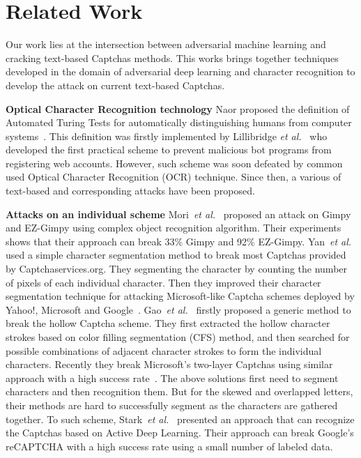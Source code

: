 \section{Related Work}
Our work lies at the intersection between adversarial machine learning and cracking text-based Captchas methods. This works brings together techniques developed in the domain of adversarial deep learning and character recognition to develop the attack on current text-based Captchas.

\noindent \textbf{Optical Character Recognition technology} Naor proposed the definition of Automated Turing Tests for automatically distinguishing humans from computer systems~\cite{Naor1996Verification}. This definition was firstly implemented by Lillibridge \emph{et al.}~\cite{Lillibridge2001Method} who developed the first practical scheme to prevent malicious bot programs from registering web accounts. However, such scheme was soon defeated by common used Optical Character Recognition (OCR) technique. Since then, a various of text-based and corresponding attacks have been proposed.

\noindent \textbf{Attacks on an individual scheme} Mori~\emph{et al.}~\cite{Mori2003Recognizing} proposed an attack on Gimpy and EZ-Gimpy using complex object recognition algorithm. Their experiments shows that their approach can break 33\% Gimpy and 92\% EZ-Gimpy. Yan~\emph{et al.}~\cite{Yan2007Breaking} used a simple character segmentation method to break most Captchas provided by Captchaservices.org. They segmenting the character by counting the number of pixels of each individual character. Then they improved their character segmentation technique for attacking Microsoft-like Captcha schemes deployed by Yahoo!, Microsoft and Google~\cite{Yan2008A}. Gao~\emph{et al.}~\cite{Gao2013The} firstly proposed a generic method to break the hollow Captcha scheme. They first extracted the hollow character strokes based on color filling segmentation (CFS) method, and then searched for possible combinations of adjacent character strokes to form the individual characters. Recently they break Microsoft’s two-layer Captchas using similar approach with a high success rate~\cite{Gao2017Research}.
The above solutions first need to segment characters and then recognition them. But for the skewed and overlapped letters, their methods are hard to successfully segment as the characters are gathered together. To such scheme, Stark~\emph{et al.}~\cite{Stark2015CAPTCHA} presented an approach that can recognize the Captchas based on Active Deep Learning. Their approach can break Google's reCAPTCHA with a high success rate using a small number of labeled data.

